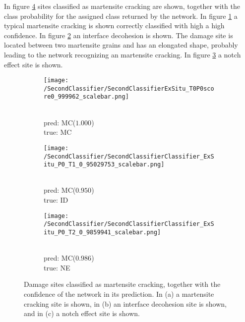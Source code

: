 In figure \ref{fig:ExSituMartensiteSamples} sites classified as martensite cracking are shown, together with the class probability for the assigned class returned by the network. In figure \ref{sub:ExSituMartensiteSamplesM} a typical martensite cracking is shown correctly classified with high a high confidence. In figure \ref{sub:ExSituMartensiteSamplesI} an interface decohesion is shown. The damage site is located between two martensite grains and has an elongated shape, probably leading to the network recognizing an martensite cracking. In figure \ref{sub:ExSituMartensiteSamplesN} a notch effect site is shown. 

\begin{figure}[H]
\centering
\begin{subfigure}{0.3\textwidth}
\texttt{[image: /SecondClassifier/SecondClassifierExSitu\_T0P0score0\_999962\_scalebar.png]}
\caption{\\pred: MC($1.000$) \\ true: MC}
\label{sub:ExSituMartensiteSamplesM}
\end{subfigure}
\begin{subfigure}{0.3\textwidth}
\texttt{[image: /SecondClassifier/SecondClassifierClassifier\_ExSitu\_P0\_T1\_0\_95029753\_scalebar.png]}
\caption{\\pred: MC($0.950$) \\ true: ID}
\label{sub:ExSituMartensiteSamplesI}
\end{subfigure}
\begin{subfigure}{0.3\textwidth}
\texttt{[image: /SecondClassifier/SecondClassifierClassifier\_ExSitu\_P0\_T2\_0\_9859941\_scalebar.png]}
\caption{\\pred: MC($0.986$) \\ true: NE}
\label{sub:ExSituMartensiteSamplesN}
\end{subfigure}
\caption{Damage sites classified as martensite cracking, together with the confidence of the network in its prediction. In (a) a martensite cracking site is shown, in (b) an interface decohesion site is shown, and in (c) a notch effect site is shown.}
\label{fig:ExSituMartensiteSamples}
\end{figure}

